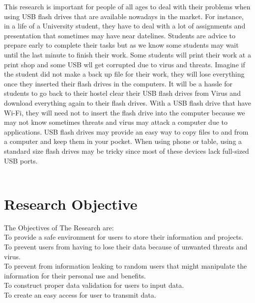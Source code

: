 \documentclass[a4paper,12pt]{article}
\begin{document}
This research is important for people of all ages to deal with their problems when using 
USB flash drives that are available nowadays in the market. For instance, in a life of a 
University student, they have to deal with a lot of assignments and presentation that sometimes may have 
near datelines. Students are advice to prepare early to complete their tasks but as we know 
some students may wait until the last minute to finish their work. Some students will print
their work at a print shop and some USB wll get corrupted due to virus and threats. 
Imagine if the student did not make a back up file for their work, they will lose everything once
they inserted their flash drives in the computers. It will be a hassle for students to go back 
to their hostel clear their USB flash drives from Virus and download everything again to their flash 
drives. With a USB flash drive that have Wi-Fi, they will need not to insert the flash drive into
the computer because we may not know sometimes threats and virus may attack a computer due to 
applications. USB flash drives may provide an easy way to copy files to and from a computer and keep them in your pocket. When using phone or table, using a standard size flash drives may be tricky since most of these devices lack full-sized USB ports.
\\
\\
\section{Research Objective}
The Objectives of The Research are: \\
To provide a safe environment for users to store their information and projects. \\
To prevent users from having to lose their data because of unwanted threats and virus. \\
To prevent from information leaking to random users that might manipulate the information
for their personal use and benefits. \\
To construct proper data validation for users to input data.\\
To create an easy access for user to transmit data. \\ 
\end{document}
